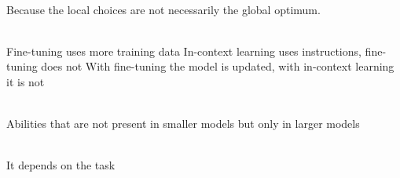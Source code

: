 \begin{quiz}
  ~\\
  Because the local choices are not necessarily the global optimum.
\end{quiz}

\begin{quiz}
  ~\\
  Fine-tuning uses more training data
  In-context learning uses instructions, fine-tuning does not
  With fine-tuning the model is updated, with in-context learning it is not
\end{quiz}

\begin{quiz}
  ~\\
  Abilities that are not present in smaller models but only in larger models
\end{quiz}

\begin{quiz}
  ~\\
  It depends on the task
\end{quiz}
